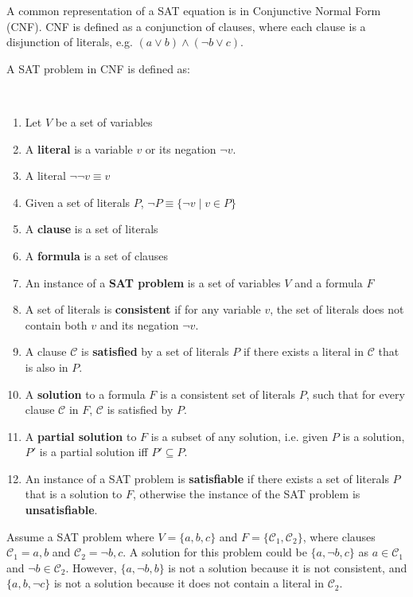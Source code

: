 A common representation of a SAT equation is in Conjunctive Normal Form (CNF).
CNF is defined as a conjunction of clauses, 
where each clause is a disjunction of literals, e.g. $(a \vee b) \wedge (\neg b \vee c)$.

A SAT problem in CNF is defined as:
\begin{defs}
\label{impl.defSAT}
{\ }
\begin{enumerate}
    \item Let $V$ be a set of variables
    \item A \textbf{literal} is a variable $v$ or its negation $\neg v$.
    \item A literal $\neg \neg v \equiv v$
    \item Given a set of literals $P$, $\neg P \equiv \{\neg v \mid v \in P\}$
    \item A \textbf{clause} is a set of literals 
    \item A \textbf{formula} is a set of clauses \label{impl.whatisaformula}
    \item An instance of a \textbf{SAT problem} is a set of variables $V$ and a formula $F$
    \item A set of literals is \textbf{consistent} if for any variable $v$, the set of literals does not contain both $v$ and its negation $\neg v$.
    \item A clause $\mathcal{C}$ is \textbf{satisfied} by a set of literals $P$ if there exists a literal in $\mathcal{C}$ that is also in $P$.
    \item A \textbf{solution} to a formula $F$ is a consistent set of literals $P$, such that for every clause $\mathcal{C}$ in $F$, $\mathcal{C}$ is satisfied by $P$.
    \item A \textbf{partial solution} to $F$ is a subset of any solution, i.e. given $P$ is a solution, $P'$ is a partial solution iff $P' \subseteq P$.
    \item An instance of a SAT problem is \textbf{satisfiable} if there exists a set of literals $P$ that is a solution to $F$, otherwise the instance of the SAT problem is \textbf{unsatisfiable}. 
\end{enumerate}
\end{defs}

Assume a SAT problem where $V = \{a,b,c\}$ and $F = \{\mathcal{C}_1,\mathcal{C}_2\}$, where clauses $\mathcal{C}_1 = {a,b}$ and $\mathcal{C}_2 = {\neg b, c}$.
A solution for this problem could be $\{a,\neg b,c\}$ as $a \in \mathcal{C}_1$ and $\neg b \in \mathcal{C}_2$.
However, $\{a, \neg b, b\}$ is not a solution because it is not consistent, and $\{a, b, \neg c\}$ is not a solution because it does not contain a literal in $\mathcal{C}_2$.  



